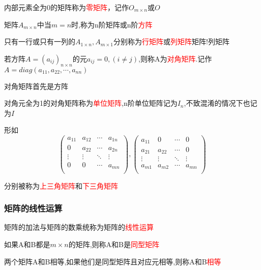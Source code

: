 内部元素全为0的矩阵称为\textcolor{red}{零矩阵}，记作$O_{m\times n}$或$O$

矩阵$A_{m\times n}$中当$m=n$时,称为n阶矩阵或n阶\textcolor{red}{方阵}

只有一行或只有一列的$A_{1\times n},A_{m\times 1}$分别称为\textcolor{red}{行矩阵}或\textcolor{red}{列矩阵}{矩阵!列矩阵}

若方阵$A=(a_{ij})_{n\times n}$的元$a_{ij}=0,(i\neq j)$,则称A为\textcolor{red}{对角矩阵}.记作$A=diag(a_{11},a_{22},\cdots,a_{nn})$

\begin{keypoint}
	对角矩阵首先是方阵
\end{keypoint}

对角元全为1的对角矩阵称为\textcolor{red}{单位矩阵},n阶单位矩阵记为$I_n$,不致混淆的情况下也记为$I$

形如
\begin{equation*}
\begin{pmatrix}
		a_{11} &a_{12}&\cdots&a_{1n}\\
	0&a_{22}&\cdots&a_{2n}\\
	\vdots&\vdots&\ddots&\vdots\\
	0&0&\cdots&a_{mn}\\
\end{pmatrix},
\begin{pmatrix}
		a_{11} &0&\cdots&0\\
	a_{21}&a_{22}&\cdots&0\\
	\vdots&\vdots&\ddots&\vdots\\
	a_{m1}&a_{m2}&\cdots&a_{mn}\\
\end{pmatrix}
\end{equation*}

分别被称为\textcolor{red}{上三角矩阵}和\textcolor{red}{下三角矩阵}

\subsubsection{矩阵的线性运算}

矩阵的加法与矩阵的数乘统称为矩阵的\textcolor{red}{线性运算}

如果A和B都是$m\times n$的矩阵,则称A和B是\textcolor{red}{同型矩阵}

两个矩阵A和B相等,如果他们是同型矩阵且对应元相等,则称A和B\textcolor{red}{相等}

